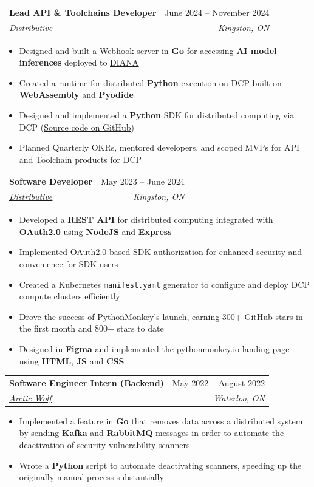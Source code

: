 \documentclass[letterpaper,11pt]{article}
\makeatletter
\newcommand{\resumeItem}[1]{
  \item\small{
    {#1 \vspace{-2pt}}
  }
}
\newcommand{\resumeSubheading}[4]{
  \vspace{1pt}\item
    \begin{tabular*}{0.97\textwidth}[t]{l@{\extracolsep{\fill}}r}
      \textbf{#1} & #2 \\
      \textit{\small#3} & \textit{\small #4} \\
    \end{tabular*}\vspace{-7pt}
}
\newcommand{\resumeItemListStart}{\begin{itemize}}
\newcommand{\resumeItemListEnd}{\end{itemize}\vspace{-5pt}}
\makeatother
\begin{document}
    \resumeSubheading
      {Lead API \& Toolchains Developer}{June 2024 -- November 2024}
      {\href{https://distributive.network/}{\underline{Distributive}}}{Kingston, ON}
      \resumeItemListStart 
        \resumeItem{Designed and built a Webhook server in \textbf{Go} for accessing \textbf{AI model inferences} deployed to \href{https://distributive.network/diana}{\underline{DIANA}}}
        \resumeItem{Created a runtime for distributed \textbf{Python} execution on \href{https://distributive.network/platform}{\underline{DCP}} built on \textbf{WebAssembly} and \textbf{Pyodide}}
        \resumeItem{Designed and implemented a \textbf{Python} SDK for distributed computing via DCP (\href{https://github.com/Distributive-Network/bifrost2}{\underline{Source code on GitHub}})}
        \resumeItem{Planned Quarterly OKRs, mentored developers, and scoped MVPs for API and Toolchain products for DCP}
      \resumeItemListEnd

    \resumeSubheading
      {Software Developer}{May 2023 -- June 2024}
      {\href{https://distributive.network/}{\underline{Distributive}}}{Kingston, ON}
      \resumeItemListStart 
        \resumeItem{Developed a \textbf{REST API} for distributed computing integrated with \textbf{OAuth2.0} using \textbf{NodeJS} and \textbf{Express}}
        \resumeItem{Implemented OAuth2.0-based SDK authorization for enhanced security and convenience for SDK users}
        \resumeItem{Created a Kubernetes \texttt{manifest.yaml} generator to configure and deploy DCP compute clusters efficiently}
        \resumeItem{Drove the success of \href{https://github.com/Distributive-Network/PythonMonkey}{\underline{PythonMonkey}}’s launch, earning 300+ GitHub stars in the first month and 800+ stars to date}
        \resumeItem{Designed in \textbf{Figma} and implemented the \href{https://pythonmonkey.io/}{\underline{pythonmonkey.io}} landing page using \textbf{HTML}, \textbf{JS} and \textbf{CSS}}
      \resumeItemListEnd

    \resumeSubheading
      {Software Engineer Intern (Backend)}{May 2022 -- August 2022}
      {\href{https://arcticwolf.com/}{\underline{Arctic Wolf}}}{Waterloo, ON}
      \resumeItemListStart 
        \resumeItem{Implemented a feature in \textbf{Go} that removes data across a distributed system by sending \textbf{Kafka} and \textbf{RabbitMQ} messages in order to automate the deactivation of security vulnerability scanners}
        \resumeItem{Wrote a \textbf{Python} script to automate deactivating scanners, speeding up the originally manual process substantially}
      \resumeItemListEnd
\end{document}
